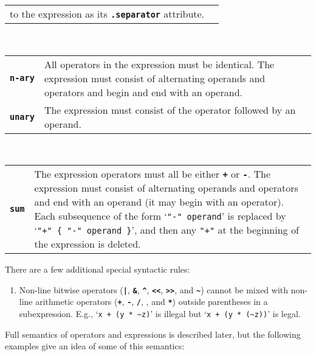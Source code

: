 \documentclass[12pt]{article}
\newcommand{\TT}[1]{{\tt \bfseries #1}}
\newcommand{\ttkey}[1]{{\tt \bfseries #1}}
\begin{document}
\begin{center}
\begin{tabular}{p{1in}p{5.0in}}
      to the expression as its \TT{.separator} attribute.
\end{tabular}
\\[0.5ex]
\begin{tabular}{p{1in}p{5.0in}}
\ttkey{n-ary}
    & All operators in the expression must be identical.
      The expression must consist of alternating operands
      and operators and begin and end with an operand.
\\[1ex]
\ttkey{unary}
    & The expression must consist of
      the operator followed by an operand.
\end{tabular}
\\[0.5ex]
\begin{tabular}{p{1in}p{5.0in}}
\ttkey{sum}
    & The expression operators must all be either \TT{+} or \TT{-}.
      The expression must consist of alternating operands
      and operators and end with an operand (it may begin with
      an operator).
      Each subsequence of the form `{\tt "-" operand}' is
      replaced by `{\tt "+" \{ "-" operand \}}', and then
      any {\tt "+"} at the beginning of the expression is deleted.
\end{tabular}
\end{center}

There are a few additional special syntactic rules:
\begin{enumerate}
\item Non-line bitwise operators (\TT{|}, \TT{\&}, \TT{\textasciicircum},
\TT{<{}<}, \TT{>{}>}, and \TT{\textasciitilde}) cannot be mixed
with non-line arithmetic operators
(\TT{+}, \TT{-}, \TT{/}, \TT{*}, and \TT{**})
outside parentheses in a subexpression.
E.g., `{\tt x + (y * \textasciitilde z)}'
is illegal but `{\tt x + (y * (\textasciitilde z))}' is legal.
\end{enumerate}


Full semantics of operators and expressions is described later,
but the following examples give an idea of some of this semantics:
\end{document}

